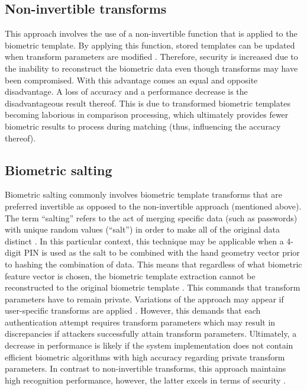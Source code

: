	\subsection{Non-invertible transforms}
	This approach involves the use of a non-invertible function that is applied to the biometric template. By applying this function, stored templates can be updated when transform parameters are modified \citep{Piciucco2016,Rathgeb2011}. Therefore, security is increased due to the inability to reconstruct the biometric data even though transforms may have been compromised. With this advantage comes an equal and opposite disadvantage. A loss of accuracy and a performance decrease is the disadvantageous result thereof. This is due to transformed biometric templates becoming laborious in comparison processing, which ultimately provides fewer biometric results to process during matching (thus, influencing the accuracy thereof).
	
	\subsection{Biometric salting}
	Biometric salting commonly involves biometric template transforms that are preferred invertible as opposed to the non-invertible approach (mentioned above). The term “salting” refers to the act of merging specific data (such as passwords) with unique random values (“salt”) in order to make all of the original data distinct \citep{SyedAhmad2012}. In this particular context, this technique may be applicable when a 4-digit PIN is used as the salt to be combined with the hand geometry vector prior to hashing the combination of data. This means that regardless of what biometric feature vector is chosen, the biometric template extraction cannot be reconstructed to the original biometric template \citep{Paul2014,Rathgeb2011}. This commands that transform parameters have to remain private. Variations of the approach may appear if user-specific transforms are applied \citep{teoh2008cancellable}. However, this demands that each authentication attempt requires transform parameters which may result in discrepancies if attackers successfully attain transform parameters. Ultimately, a decrease in performance is likely if the system implementation does not contain efficient biometric algorithms with high accuracy regarding private transform parameters. In contrast to non-invertible transforms, this approach maintains high recognition performance, however, the latter excels in terms of security \citep{Radha2011, Rathgeb2011}.



